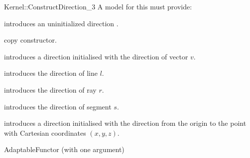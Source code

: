 \begin{ccRefFunctionObjectConcept}{Kernel::ConstructDirection_3}
A model for this must provide:



\ccHidden {}
             {introduces an uninitialized direction .}

\ccHidden {}
            {copy constructor.}

            {introduces a direction  initialised with the 
             direction of vector $v$.}

            {introduces the direction of line $l$.}

            {introduces the direction of ray $r$.}

            {introduces the direction of segment $s$.}

\ccHidden{}
            {introduces a direction  initialised with the direction 
             from the origin to the point with Cartesian coordinates $(x, y, z)$.}

\ccRefines
AdaptableFunctor (with one argument)

\ccSeeAlso

  \\

\end{ccRefFunctionObjectConcept}
